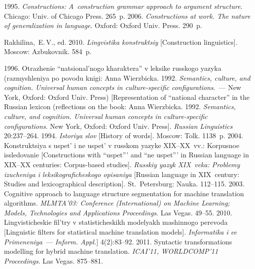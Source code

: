\begin{multicols}{2}
{{\begin{thebibliography}{99}
 1995. \textit{Constructions: A~construction grammar approach to
argument structure}. Chicago: Univ. of Chicago Press. 265~p.
2006. \textit{Constructions at work. The nature of generalization in language}.
Oxford: Oxford Univ. Press. 290~p.

Rakhilina,~E.\,V., ed.
2010. \textit{Lingvistika konstruktsiy} [Construction linguistics]. Moscow: Azbukovnik.
584~p.

 1996. Otrazhenie ``natsional'nogo kharaktera'' v leksike russkogo yazyka
(razmyshleniya po povodu knigi: Anna Wierzbicka. 1992. \textit{Semantics, culture, and
cognition. Universal human concepts in culture-specific configurations}.~--- New York,
Oxford: Oxford Univ. Press) [Representation of ``national character'' in the
Russian lexicon (reflections on the book: Anna Wierzbicka. 1992. \textit{Semantics,
culture, and cognition. Universal human concepts in culture-specific configurations}.
New York, Oxford: Oxford Univ. Press]. \textit{Russian Linguistics} 20:237--264.
 1994. \textit{Istoriya slov} [History of words]. Moscow: Tolk. 1138~p.
 2004. Konstruktsiya s uspet' i ne uspet' v russkom yazyke XIX--XX~vv.: Korpusnoe
issledovanie [Constructions with ``uspet''' and ``ne uspet''' in Russian language
in XIX--XX centuries: Corpus-based studies]. \textit{Russkiy yazyk XIX~veka: Problemy
izucheniya i leksikograficheskogo opisaniya} [Russian language in XIX~century:
Studies and lexicographical description]. St.\ Petersburg: Nauka. 112--115.
2003. Cognitive approach to language structure segmentation for machine
translation algorithms. \textit{MLMTA'03:  Conference (International) on
Machine Learning; Models, Technologies and Applications Proceedings}. Las Vegas. 49--55.
 2010. Lingvisticheskie fil'try v stati\-sti\-che\-skikh modelyakh mashinnogo perevoda
[Linguistic filters for statistical machine translation models].
\textit{Informatika i ee Primeneniya}~--- \textit{Inform. Appl.}] 4(2):83--92.
 2011. Syntactic transformations modelling for hybrid machine translation.
\textit{ICAI'11, WORLDCOMP'11 Proceedings}. Las Vegas. 875--881.

\end{thebibliography}
} }


\end{multicols}

